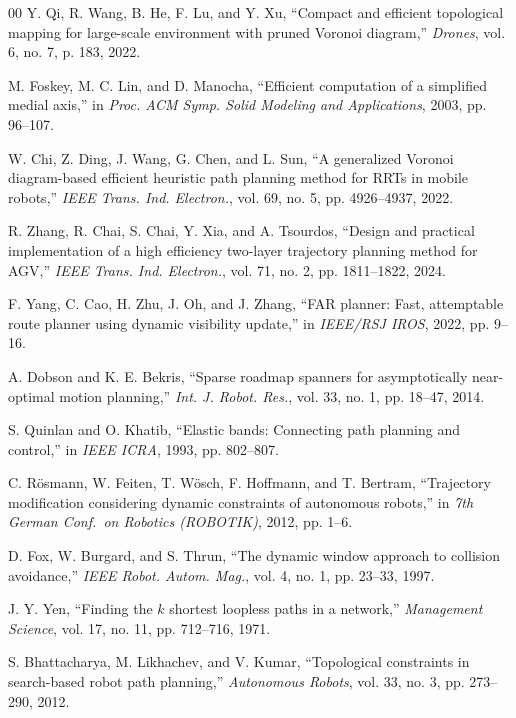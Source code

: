 \documentclass[conference]{IEEEtran}
\begin{document}
\begin{thebibliography}{00}
 Y. Qi, R. Wang, B. He, F. Lu, and Y. Xu, ``Compact and efficient topological mapping for large-scale environment with pruned Voronoi diagram,'' \textit{Drones}, vol. 6, no. 7, p. 183, 2022.

 M. Foskey, M. C. Lin, and D. Manocha, ``Efficient computation of a simplified medial axis,'' in \textit{Proc. ACM Symp. Solid Modeling and Applications}, 2003, pp. 96--107.

 W. Chi, Z. Ding, J. Wang, G. Chen, and L. Sun, ``A generalized Voronoi diagram-based efficient heuristic path planning method for RRTs in mobile robots,'' \textit{IEEE Trans. Ind. Electron.}, vol. 69, no. 5, pp. 4926--4937, 2022.

 R. Zhang, R. Chai, S. Chai, Y. Xia, and A. Tsourdos, ``Design and practical implementation of a high efficiency two-layer trajectory planning method for AGV,'' \textit{IEEE Trans. Ind. Electron.}, vol. 71, no. 2, pp. 1811--1822, 2024.

 F. Yang, C. Cao, H. Zhu, J. Oh, and J. Zhang, ``FAR planner: Fast, attemptable route planner using dynamic visibility update,'' in \textit{IEEE/RSJ IROS}, 2022, pp. 9--16.

 A. Dobson and K. E. Bekris, ``Sparse roadmap spanners for asymptotically near-optimal motion planning,'' \textit{Int. J. Robot. Res.}, vol. 33, no. 1, pp. 18--47, 2014.

 S. Quinlan and O. Khatib, ``Elastic bands: Connecting path planning and control,'' in \textit{IEEE ICRA}, 1993, pp. 802--807.

 C. R\"osmann, W. Feiten, T. W\"osch, F. Hoffmann, and T. Bertram, ``Trajectory modification considering dynamic constraints of autonomous robots,'' in \textit{7th German Conf.\ on Robotics (ROBOTIK)}, 2012, pp. 1--6.

 D. Fox, W. Burgard, and S. Thrun, ``The dynamic window approach to collision avoidance,'' \textit{IEEE Robot. Autom. Mag.}, vol. 4, no. 1, pp. 23--33, 1997.

 J. Y. Yen, ``Finding the $k$ shortest loopless paths in a network,'' \textit{Management Science}, vol. 17, no. 11, pp. 712--716, 1971.

 S. Bhattacharya, M. Likhachev, and V. Kumar, ``Topological constraints in search-based robot path planning,'' \textit{Autonomous Robots}, vol. 33, no. 3, pp. 273--290, 2012.

\end{thebibliography}
\end{document}
